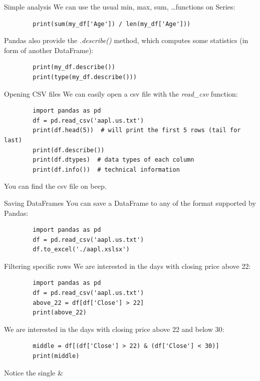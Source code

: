 \documentclass[aspectratio=169,handout]{beamer}
\begin{document}
\begin{frame}[fragile]{Simple analysis}
    We can use the usual min, max, sum, \ldots functions on Series:
    \begin{verbatim}
        print(sum(my_df['Age']) / len(my_df['Age']))
    \end{verbatim}

    Pandas also provide the \emph{.describe()} method, which computes some statistics (in form of another DataFrame):
    \begin{verbatim}
        print(my_df.describe())
        print(type(my_df.describe()))
    \end{verbatim}
\end{frame}

\begin{frame}[fragile]{Opening CSV files}
    We can easily open a csv file with the \emph{read\_csv} function:
    \begin{verbatim}
        import pandas as pd
        df = pd.read_csv('aapl.us.txt')
        print(df.head(5))  # will print the first 5 rows (tail for last)
        print(df.describe())
        print(df.dtypes)  # data types of each column
        print(df.info())  # technical information
    \end{verbatim}

    You can find the csv file on beep.
\end{frame}

\begin{frame}[fragile]{Saving DataFrames}
    You can save a DataFrame to any of the format supported by Pandas:
    \begin{verbatim}
        import pandas as pd
        df = pd.read_csv('aapl.us.txt')
        df.to_excel('./aapl.xslsx')
    \end{verbatim}
\end{frame}

\begin{frame}[fragile]{Filtering specific rows}
    We are interested in the days with closing price above 22:
    \begin{verbatim}
        import pandas as pd
        df = pd.read_csv('aapl.us.txt')
        above_22 = df[df['Close'] > 22]
        print(above_22)
    \end{verbatim}

    We are interested in the days with closing price above 22 and below 30:
    \begin{verbatim}
        middle = df[(df['Close'] > 22) & (df['Close'] < 30)]
        print(middle)
    \end{verbatim}

    Notice the single \&
\end{frame}
\end{document}
